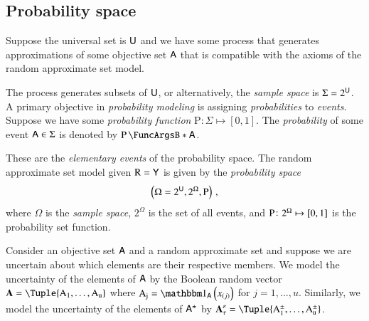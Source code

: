 \documentclass[10pt,final,hidelinks]{article}
\numberwithin{equation}{section}
\providecommand{\Given}{\vert}
\newcommand{\SetIndicator}[1]{\BlackboardSet{1}_{#1}}
\newcommand{\EmptySet}{\varnothing}
\newcommand{\PS}[1]{2^{#1}}
\newcommand{\tprate}{\tau}
\newcommand{\fprate}{\varepsilon}
\newcommand{\RV}[1]{\mathrm{#1}}
\newcommand{\ProbFn}{\mathrm{P}}
\theoremstyle{plain}
\renewcommand{\vec}[1]{\boldsymbol{\mathbf{#1}}}
\begin{document}
\subsection{Probability space}
\label{sec:prob_model}
Suppose the universal set is $\Set{U}$ and we have some process that generates approximations of some objective set $\Set{A}$ that is compatible with the axioms of the random approximate set model.


The process generates subsets of $\Set{U}$, or alternatively, the \emph{sample space} is $\Sigma = \PS{\Set{U}}$.
A primary objective in \emph{probability modeling} is assigning \emph{probabilities} to \emph{events}.
Suppose we have some \emph{probability function} $\ProbFn \colon \Sigma \mapsto [0,1]$.
The \emph{probability} of some event $\Set{A} \in \Sigma$ is denoted by $\Prob{\Set{A}}$.


These are the \emph{elementary events} of the probability space.
The random approximate set model given $\RV{R} = \Set{Y}$ is given by the \emph{probability space}
\begin{equation}
\left(\Omega = \PS{\Set{U}}, \PS{\Omega}, \Fun{P}\right)\,,
\end{equation}
where $\Omega$ is the \emph{sample space}, $\PS{\Omega}$ is the set of all events, and $\Fun{P} \colon \PS{\Omega} \mapsto [0,1]$ is the probability set function.




Consider an objective set $\Set{A}$ and a random approximate set  and suppose we are uncertain about which elements are their respective members.
We model the uncertainty of the elements of $\Set{A}$ by the Boolean random vector $\vec{A} = \Tuple{\RV{A_1},\ldots,\RV{A_u}}$ where $\RV{A_j} = \SetIndicator{\Set{A}}\left(x_{(j)}\right)$ for $j=1,\ldots,u$.
Similarly, we model the uncertainty of the elements of $\ASet{A}$ by $\AVec{A}[\tprate][\fprate] = \Tuple{\AVecComp{A}[1],\ldots,\AVecComp{A}[u]}$.
\end{document}

